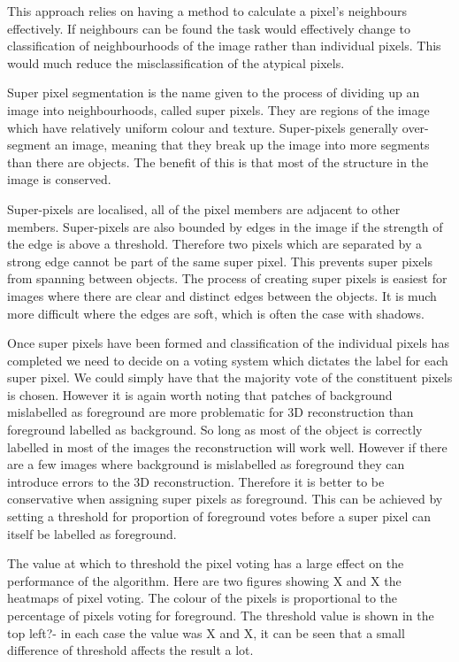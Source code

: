 \documentclass[12pt]{IIBproject}
\begin{document}
This approach relies on having a method to calculate a pixel's neighbours effectively. If neighbours can be found the task would effectively change to classification of neighbourhoods of the image rather than individual pixels. This would much reduce the misclassification of the atypical pixels.

Super pixel segmentation is the name given to the process of dividing up an image into neighbourhoods, called super pixels. They are regions of the image which have relatively uniform colour and texture. Super-pixels generally over-segment an image, meaning that they break up the image into more segments than there are objects. The benefit of this is that most of the structure in the image is conserved\cite{RenMalik03}.  

Super-pixels are localised, all of the pixel members are adjacent to other members. Super-pixels are also bounded by edges in the image if the strength of the edge is above a threshold. Therefore two pixels which are separated by a strong edge cannot be part of the same super pixel. This prevents super pixels from spanning between objects. The process of creating super pixels is easiest for images where there are clear and distinct edges between the objects. It is much more difficult where the edges are soft, which is often the case with shadows. 

Once super pixels have been formed and classification of the individual pixels has completed we need to decide on a voting system which dictates the label for each super pixel. We could simply have that the majority vote of the constituent pixels is chosen. However it is again worth noting that patches of background mislabelled as foreground are more problematic for 3D reconstruction than foreground labelled as background. So long as most of the object is correctly labelled in most of the images the reconstruction will work well. However if there are a few images where background is mislabelled as foreground they can introduce errors to the 3D reconstruction. Therefore it is better to be conservative when assigning super pixels as foreground. This can be achieved by setting a threshold for proportion of foreground votes before a super pixel can itself be labelled as foreground.

The value at which to threshold the pixel voting has a large effect on the performance of the algorithm. Here are two figures showing X and X the heatmaps of pixel voting. The colour of the pixels is proportional to the percentage of pixels voting for foreground. The threshold value is shown in the top left?- in each case the value was X and X, it can be seen that a small difference of threshold affects the result a lot. 
\end{document}
